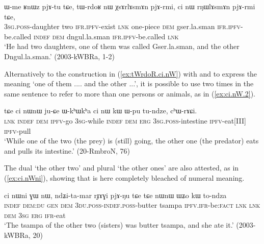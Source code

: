 \begin{exe}
\ex \label{ex:tWrdoR.ci.nW}
 \gll 
ɯ-me ʁnɯz pjɤ-tu tɕe, tɯ-rdoʁ nɯ χsɤrlɤsmɤn pjɤ-rmi, ci nɯ rŋɯlɤsmɤn pjɤ-rmi tɕe, \\
\textsc{3sg}.\textsc{poss}-daughter two \textsc{ifr}.\textsc{ipfv}-exist \textsc{lnk} one-piece \textsc{dem} gser.la.sman \textsc{ifr}.\textsc{ipfv}-be.called \textsc{indef} \textsc{dem} dngul.la.sman \textsc{ifr}.\textsc{ipfv}-be.called \textsc{lnk} \\
\glt `He had two daughters, one of them was called Gser.la.sman, and the other Dngul.la.sman.' (2003-kWBRa, 1-2)
\end{exe}

Alternatively to the construction in (\ref{ex:tWrdoR.ci.nW}) with  and  to express the meaning `one of them .... and the other ...', it is possible to use  two times in the same sentence to refer to more than one persons or animals, as in (\ref{ex:ci.nW.2}).

\begin{exe}
\ex \label{ex:ci.nW.2}
 \gll tɕe ci nɯnɯ ju-ɕe ɯ-kʰɯkʰa ci nɯ kɯ ɯ-pu tu-ndze, cʰɯ-rɤɕi. \\
\textsc{lnk} \textsc{indef} \textsc{dem} \textsc{ipfv}-go \textsc{3sg}-while \textsc{indef} \textsc{dem} \textsc{erg} \textsc{3sg}.\textsc{poss}-intestine \textsc{ipfv}-eat[III] \textsc{ipfv}-pull \\
\glt `While one of the two (the prey) is (still) going, the other one (the predator) eats and pulls its intestine.'  (20-RmbroN, 76)
\end{exe}

The dual  `the other two' and plural  `the other ones' are also attested, as in (\ref{ex:ci.nWni}), showing that  is here completely bleached of numeral meaning.

 \begin{exe}
\ex \label{ex:ci.nWni}
 \gll  ci nɯni ɣɯ nɯ, ndʑi-ta-mar rɟɤɣi pjɤ-ŋu tɕe tɕe nɯnɯ ɯʑo kɯ to-ndza \\
\textsc{indef} \textsc{dem}:\textsc{du} \textsc{gen} \textsc{dem} \textsc{3du}.\textsc{poss}-\textsc{indef}.\textsc{poss}-butter tsampa \textsc{ipfv}.\textsc{ifr}-be:\textsc{fact} \textsc{lnk} \textsc{lnk} \textsc{dem} \textsc{3sg} \textsc{erg} \textsc{ifr}-eat \\
\glt `The tsampa of the other two (sisters) was butter tsampa, and she ate it.' (2003-kWBRa, 20)
\end{exe}

